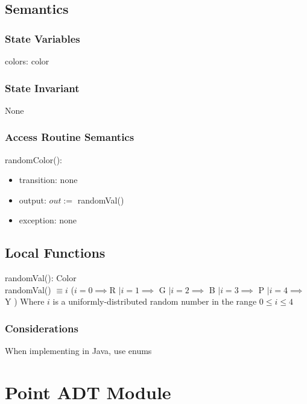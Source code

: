 \documentclass[12pt]{article}
\begin{document}
\subsection* {Semantics}

\subsubsection* {State Variables}

colors: color

\subsubsection* {State Invariant}

None

\subsubsection* {Access Routine Semantics}

\noindent randomColor():
\begin{itemize}
\item transition: none
\item output: $out :=$ randomVal()
\item exception: none
\end{itemize}


\subsection*{Local Functions}

\noindent randomVal(): Color\\
\noindent randomVal() $\equiv i$ ($i = 0 \implies $R $| i = 1 \implies$ G $| i = 2 \implies$ B $| i = 3 \implies$ P $| i = 4 \implies$ Y ) 
Where $i$ is a uniformly-distributed random number in the range $0 \leq i \leq 4$ \\


\subsubsection* {Considerations}

When implementing in Java, use enums

\newpage

\section* {Point ADT Module}
\end{document}
